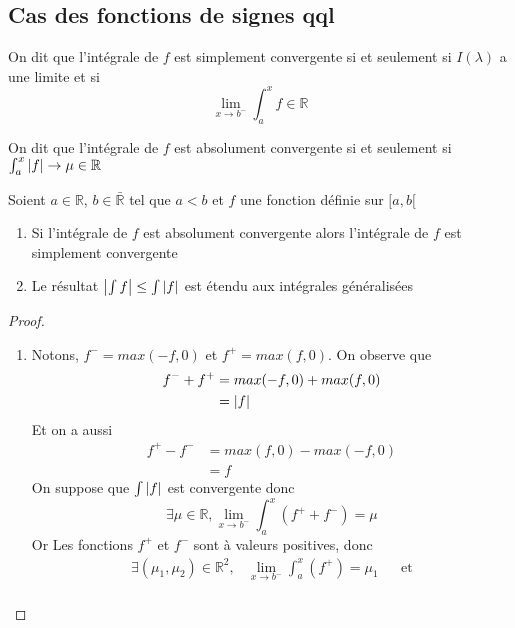 \documentclass[11pt,colorlinks]{book}
\theoremstyle{mytheoremstyle}
\theoremstyle{mytheoremstyle}
\theoremstyle{mytheoremstyle}
\theoremstyle{mytheoremstyle}
\theoremstyle{mytheoremstyle}
\theoremstyle{mytheoremstyle}
\theoremstyle{mytheoremstyle}
\theoremstyle{mytheoremstyle}
\theoremstyle{myproblemstyle}
\def\mbb#1{\mathbb{#1}}
\def\bR{\mbb{R}}
\begin{document}
  \subsection{Cas des fonctions de signes qql}
  \begin{definition}
    On dit que l'intégrale de $f$ est simplement convergente si et seulement si $I(\lambda)$ a une limite et si
    \begin{equation*}
      \lim_{x \to b^{-}} \int_a^x f \in \bR
    \end{equation*}
  \end{definition}
  \begin{definition}
    On dit que l'intégrale de $f$ est absolument convergente si et seulement si $\int_a^x \abs{f} \to \mu \in \bR$ 
  \end{definition}
  \begin{theorem}[Comparaison]
    Soient $a \in \bR$, $b \in \bar{\bR}$ tel que $a < b$ et $f$ une fonction définie sur $[a,b[$
    \begin{enumerate}
      \item Si l'intégrale de $f$ est absolument convergente alors l'intégrale de $f$ est simplement convergente
      \item Le résultat $\abs{\int f} \leq \int \abs{f}$ est étendu aux intégrales généralisées
    \end{enumerate}
    \begin{proof}
      \begin{enumerate}
        \item Notons, $f^{-} = max(-f,0)$ et $f^{+} = max(f,0)$. On observe que 
      \begin{align*}
        f^{-} + f^{+} &= max(-f,0) + max(f,0) \\ 
                      &= \abs{f}
      \end{align*}
      Et on a aussi
      \begin{align*}
        f^{+} - f^{-} &= max(f,0) - max(-f,0) \\ 
                     &= f
      \end{align*}
      On suppose que $\int \abs{f}$ est convergente donc 
      \begin{equation*}
        \exists \mu \in \bR, \lim_{x \to b^{-}} \int_a^x (f^{+}+f^{-}) = \mu
      \end{equation*}
      Or Les fonctions $f^{+}$ et $f^{-}$ sont à valeurs positives, donc
      \begin{align*}
        \exists (\mu_1,\mu_2) \in \bR^2, &\lim_{x \to b^{-}} \int_a^x (f^{+}) = \mu_1 && \text{et} \\ 

\end{align*}
\end{enumerate}
\end{proof}
\end{theorem}
\end{document}
